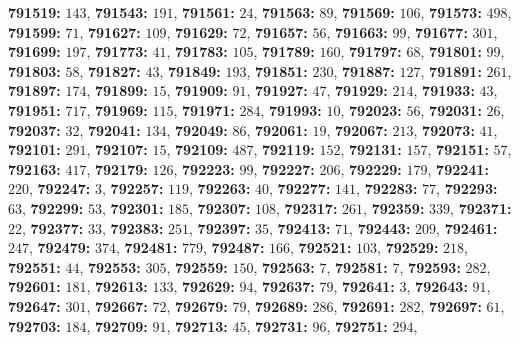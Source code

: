 \textsf{\bfseries 791519:} $143$, \textsf{\bfseries 791543:} $191$, \textsf{\bfseries 791561:} $24$, \textsf{\bfseries 791563:} $89$, \textsf{\bfseries 791569:} $106$, \textsf{\bfseries 791573:} $498$, \textsf{\bfseries 791599:} $71$, \textsf{\bfseries 791627:} $109$, \textsf{\bfseries 791629:} $72$, \textsf{\bfseries 791657:} $56$, \textsf{\bfseries 791663:} $99$, \textsf{\bfseries 791677:} $301$, \textsf{\bfseries 791699:} $197$, \textsf{\bfseries 791773:} $41$, \textsf{\bfseries 791783:} $105$, \textsf{\bfseries 791789:} $160$, \textsf{\bfseries 791797:} $68$, \textsf{\bfseries 791801:} $99$, \textsf{\bfseries 791803:} $58$, \textsf{\bfseries 791827:} $43$, \textsf{\bfseries 791849:} $193$, \textsf{\bfseries 791851:} $230$, \textsf{\bfseries 791887:} $127$, \textsf{\bfseries 791891:} $261$, \textsf{\bfseries 791897:} $174$, \textsf{\bfseries 791899:} $15$, \textsf{\bfseries 791909:} $91$, \textsf{\bfseries 791927:} $47$, \textsf{\bfseries 791929:} $214$, \textsf{\bfseries 791933:} $43$, \textsf{\bfseries 791951:} $717$, \textsf{\bfseries 791969:} $115$, \textsf{\bfseries 791971:} $284$, \textsf{\bfseries 791993:} $10$, \textsf{\bfseries 792023:} $56$, \textsf{\bfseries 792031:} $26$, \textsf{\bfseries 792037:} $32$, \textsf{\bfseries 792041:} $134$, \textsf{\bfseries 792049:} $86$, \textsf{\bfseries 792061:} $19$, \textsf{\bfseries 792067:} $213$, \textsf{\bfseries 792073:} $41$, \textsf{\bfseries 792101:} $291$, \textsf{\bfseries 792107:} $15$, \textsf{\bfseries 792109:} $487$, \textsf{\bfseries 792119:} $152$, \textsf{\bfseries 792131:} $157$, \textsf{\bfseries 792151:} $57$, \textsf{\bfseries 792163:} $417$, \textsf{\bfseries 792179:} $126$, \textsf{\bfseries 792223:} $99$, \textsf{\bfseries 792227:} $206$, \textsf{\bfseries 792229:} $179$, \textsf{\bfseries 792241:} $220$, \textsf{\bfseries 792247:} $3$, \textsf{\bfseries 792257:} $119$, \textsf{\bfseries 792263:} $40$, \textsf{\bfseries 792277:} $141$, \textsf{\bfseries 792283:} $77$, \textsf{\bfseries 792293:} $63$, \textsf{\bfseries 792299:} $53$, \textsf{\bfseries 792301:} $185$, \textsf{\bfseries 792307:} $108$, \textsf{\bfseries 792317:} $261$, \textsf{\bfseries 792359:} $339$, \textsf{\bfseries 792371:} $22$, \textsf{\bfseries 792377:} $33$, \textsf{\bfseries 792383:} $251$, \textsf{\bfseries 792397:} $35$, \textsf{\bfseries 792413:} $71$, \textsf{\bfseries 792443:} $209$, \textsf{\bfseries 792461:} $247$, \textsf{\bfseries 792479:} $374$, \textsf{\bfseries 792481:} $779$, \textsf{\bfseries 792487:} $166$, \textsf{\bfseries 792521:} $103$, \textsf{\bfseries 792529:} $218$, \textsf{\bfseries 792551:} $44$, \textsf{\bfseries 792553:} $305$, \textsf{\bfseries 792559:} $150$, \textsf{\bfseries 792563:} $7$, \textsf{\bfseries 792581:} $7$, \textsf{\bfseries 792593:} $282$, \textsf{\bfseries 792601:} $181$, \textsf{\bfseries 792613:} $133$, \textsf{\bfseries 792629:} $94$, \textsf{\bfseries 792637:} $79$, \textsf{\bfseries 792641:} $3$, \textsf{\bfseries 792643:} $91$, \textsf{\bfseries 792647:} $301$, \textsf{\bfseries 792667:} $72$, \textsf{\bfseries 792679:} $79$, \textsf{\bfseries 792689:} $286$, \textsf{\bfseries 792691:} $282$, \textsf{\bfseries 792697:} $61$, \textsf{\bfseries 792703:} $184$, \textsf{\bfseries 792709:} $91$, \textsf{\bfseries 792713:} $45$, \textsf{\bfseries 792731:} $96$, \textsf{\bfseries 792751:} $294$, 
